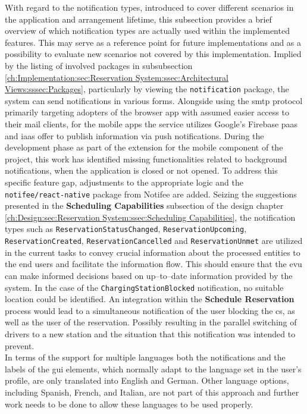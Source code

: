 With regard to the notification types, introduced to cover different scenarios in the application and arrangement lifetime, this subsection provides a brief overview of which notification types are actually used within the implemented features.
This may serve as a reference point for future implementations and as a possibility to evaluate new scenarios not covered by this implementation.
Implied by the listing of involved packages in subsubsection \ref{ch:Implementation:sec:Reservation System:ssec:Architectural Views:sssec:Packages}, particularly by viewing the \texttt{notification} package, the system can send notifications in various forms.
Alongside using the \acrshort{smtp} protocol \cite{klensin_simple_2008} primarily targeting adopters of the browser app with assumed easier access to their mail clients, for the mobile apps the service utilizes Google's Firebase \cite{noauthor_firebase_nodate} \acrshort{paas} and \acrshort{iaas} offer to publish information via push notifications.
During the development phase as part of the extension for the mobile component of the project, this work has identified missing functionalities related to background notifications, when the application is closed or not opened. To address this specific feature gap, adjustments to the appropriate logic and the \texttt{notifee/react-native} package from Notifee \cite{noauthor_notifee_nodate} are added.
Seizing the suggestions presented in the \textbf{Scheduling Capabilities} subsection of the design chapter \ref{ch:Design:sec:Reservation System:ssec:Scheduling Capabilities}, the notification types such as \texttt{ReservationStatusChanged}, \texttt{ReservationUpcoming}, \texttt{ReservationCreated}, \texttt{ReservationCancelled} and \texttt{ReservationUnmet} are utilized in the current tasks to convey crucial information about the processed entities to the end users and facilitate the information flow.
This should ensure that the \acrshort{evu} can make informed decisions based on up--to--date information provided by the system.
In the case of the \texttt{ChargingStationBlocked} notification, no suitable location could be identified. An integration within the \textbf{Schedule Reservation} process would lead to a simultaneous notification of the user blocking the \acrshort{cs}, as well as the user of the reservation. 
Possibly resulting in the parallel switching of drivers to a new station and the situation that this notification was intended to prevent. \\
\noindent In terms of the support for multiple languages both the notifications and the labels of the \acrshort{gui} elements, which normally adapt to the language set in the user's profile, are only translated into English and German.
Other language options, including Spanish, French, and Italian, are not part of this approach and further work needs to be done to allow these languages to be used properly.

